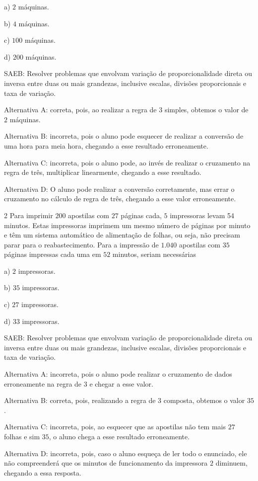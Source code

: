 a) $2$ máquinas.

b) $4$ máquinas.

c) $100$ máquinas.

d) $200$ máquinas.

SAEB: Resolver problemas que envolvam variação de proporcionalidade
direta ou inversa entre duas ou mais grandezas, inclusive escalas,
divisões proporcionais e taxa de variação.

Alternativa A: correta, pois, ao realizar a regra de $3$ simples, obtemos
o valor de $2$ máquinas.

Alternativa B: incorreta, pois o aluno pode esquecer de realizar a
conversão de uma hora para meia hora, chegando a esse resultado
erroneamente.

Alternativa C: incorreta, pois o aluno pode, ao invés de realizar o
cruzamento na regra de três, multiplicar linearmente, chegando a esse
resultado.

Alternativa D: O aluno pode realizar a conversão corretamente, mas errar
o cruzamento no cálculo de regra de três, chegando a esse valor
erroneamente.

\num{2}  Para imprimir $200$ apostilas com $27$ páginas cada, $5$ impressoras levam
54 minutos. Estas impressoras imprimem um mesmo número de páginas por
minuto e têm um sistema automático de alimentação de folhas, ou seja,
não precisam parar para o reabastecimento. Para a impressão de $1.040$
apostilas com $35$ páginas impressas cada uma em $52$ minutos, seriam
necessárias

a) $2$ impressoras.

b) $35$ impressoras.

c) $27$ impressoras.

d) $33$ impressoras.

SAEB: Resolver problemas que envolvam variação de proporcionalidade
direta ou inversa entre duas ou mais grandezas, inclusive escalas,
divisões proporcionais e taxa de variação.

Alternativa A: incorreta, pois o aluno pode realizar o cruzamento de
dados erroneamente na regra de $3$ e chegar a esse valor.

Alternativa B: correta, pois, realizando a regra de $3$ composta, obtemos
o valor $35$.

Alternativa C: incorreta, pois, ao esquecer que as apostilas não tem
mais $27$ folhas e sim $35$, o aluno chega a esse resultado erroneamente.

Alternativa D: incorreta, pois, caso o aluno esqueça de ler todo o
enunciado, ele não compreenderá que os minutos de funcionamento da
impressora $2$ diminuem, chegando a essa resposta.

